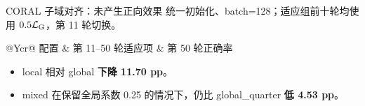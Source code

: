 \begin{frame}[t]{CORAL 子域对齐：未产生正向效果}
\small
统一初始化、batch=128；适应组前十轮均使用 $0.5\mathcal L_{\mathrm{G}}$，第 11 轮切换。
\vspace{2mm}
\begin{tabularx}{\linewidth}{@{}Ycr@{}}
\toprule
配置 & 第 11--50 轮适应项 & 第 50 轮正确率 \\
\midrule
\SubRows
\bottomrule
\end{tabularx}
\vspace{3mm}
\begin{itemize}
  \item local 相对 global \textbf{下降 11.70 pp}。
  \item mixed 在保留全局系数 0.25 的情况下，仍比 global\_quarter \textbf{低 4.53 pp}。
\end{itemize}
\end{frame}
